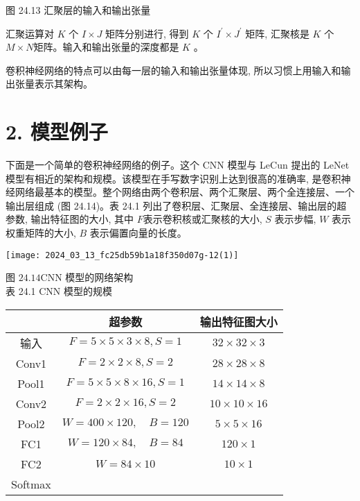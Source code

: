 \documentclass[10pt]{article}
\begin{document}
图 24.13 汇聚层的输入和输出张量

汇聚运算对 $K$ 个 $I \times J$ 矩阵分别进行, 得到 $K$ 个 $I^{\prime} \times J^{\prime}$ 矩阵, 汇聚核是 $K$ 个 $M \times N$矩阵。输入和输出张量的深度都是 $K$ 。

卷积神经网络的特点可以由每一层的输入和输出张量体现, 所以习惯上用输入和输出张量表示其架构。

\section*{2. 模型例子}
下面是一个简单的卷积神经网络的例子。这个 CNN 模型与 LeCun 提出的 LeNet 模型有相近的架构和规模。该模型在手写数字识别上达到很高的准确率, 是卷积神经网络最基本的模型。整个网络由两个卷积层、两个汇聚层、两个全连接层、一个输出层组成 (图 24.14)。表 24.1 列出了卷积层、汇聚层、全连接层、输出层的超参数, 输出特征图的大小, 其中 $F$表示卷积核或汇聚核的大小, $S$ 表示步幅, $W$ 表示权重矩阵的大小, $B$ 表示偏置向量的长度。

\begin{center}
\texttt{[image: 2024\_03\_13\_fc25db59b1a18f350d07g-12(1)]}
\end{center}

图 $24.14 \mathrm{CNN}$ 模型的网络架构\\
表 24.1 CNN 模型的规模

\begin{center}
\begin{tabular}{c|c|c}
\hline
 & 超参数 & 输出特征图大小 \\
\hline
输入 & $F=5 \times 5 \times 3 \times 8, S=1$ & $32 \times 32 \times 3$ \\
\hline
Conv1 & $F=2 \times 2 \times 8, S=2$ & $28 \times 28 \times 8$ \\
\hline
Pool1 & $F=5 \times 5 \times 8 \times 16, S=1$ & $14 \times 14 \times 8$ \\
\hline
Conv2 & $F=2 \times 2 \times 16, S=2$ & $10 \times 10 \times 16$ \\
\hline
Pool2 & $W=400 \times 120, \quad B=120$ & $5 \times 5 \times 16$ \\
\hline
FC1 & $W=120 \times 84, \quad B=84$ & $120 \times 1$ \\
\hline
FC2 & $W=84 \times 10$ & $10 \times 1$ \\
\hline
Softmax &  &  \\
\hline
\end{tabular}
\end{center}
\end{document}
